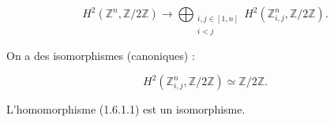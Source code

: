 \begin{equation}
  H^2(\mathbb Z^n,\mathbb Z/2\mathbb Z)
  \longrightarrow
  \bigoplus_{\substack{i,j\in[1,n]\\ i<j}}
    H^2(\mathbb Z^n_{i,j},\mathbb Z/2\mathbb Z).
  \tag{1.6.1.1}
\end{equation}

On a des isomorphismes (canoniques) :

\begin{equation}
  H^2(\mathbb Z^n_{i,j},\mathbb Z/2\mathbb Z)
  \simeq \mathbb Z/2\mathbb Z.
  \tag{1.6.1.2}
\end{equation}

L'homomorphisme (1.6.1.1) est un isomorphisme.
